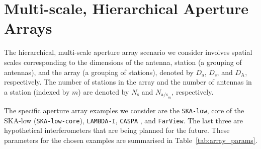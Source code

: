 \documentclass[
  journal=pasa,
  manuscript=article-type,
  year=2020,
  volume=37,
]{cup-journal}
\begin{document}



\section{Multi-scale, Hierarchical Aperture Arrays} \label{sec:multi-scale-arrays}

The hierarchical, multi-scale aperture array scenario we consider involves spatial scales corresponding to the dimensions of the antenna, station (a grouping of antennas), and the array (a grouping of stations), denoted by $D_\textrm{a}$, $D_\textrm{s}$, and $D_\textrm{A}$, respectively. The number of stations in the array and the number of antennas in a station (indexed by $m$) are denoted by $N_\textrm{s}$ and $N_{\textrm{a/s}_m}$, respectively. 

The specific aperture array examples we consider are the \texttt{SKA-low}, core of the SKA-low (\texttt{SKA-low-core}), \texttt{LAMBDA-I}, \texttt{CASPA} \citep{Luo+2024}, and \texttt{FarView}. The last three are hypothetical interferometers that are being planned for the future. 
These parameters for the chosen examples are summarised in Table~\ref{tab:array_params}. 
\end{document}

